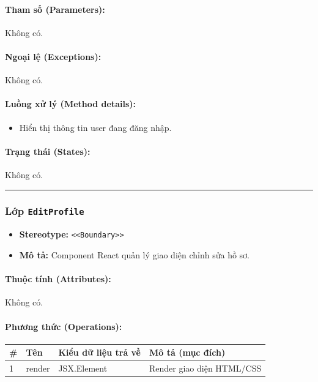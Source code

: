 \documentclass[12pt,a4paper]{article}
\begin{document}
\paragraph{Tham số (Parameters):}
Không có.

\paragraph{Ngoại lệ (Exceptions):}
Không có.

\paragraph{Luồng xử lý (Method details):}
\begin{itemize}[leftmargin=*]
    \item Hiển thị thông tin user đang đăng nhập.
\end{itemize}


\paragraph{Trạng thái (States):}
Không có.

\vskip 0.5cm
\noindent\rule{\textwidth}{0.5pt}
\vskip 0.5cm

\subsubsection{Lớp \texttt{EditProfile}}

\begin{itemize}[leftmargin=*]
    \item \textbf{Stereotype:} \texttt{\textless{}\textless{}Boundary\textgreater{}\textgreater{}}
    \item \textbf{Mô tả:} Component React quản lý giao diện chỉnh sửa hồ sơ.
\end{itemize}

\paragraph{Thuộc tính (Attributes):}
Không có.

\paragraph{Phương thức (Operations):}
\begin{longtable}{|p{0.6cm}|p{5.0cm}|p{2.8cm}|p{5.4cm}|}
\hline
\textbf{\#} & \textbf{Tên} & \textbf{Kiểu dữ liệu trả về} & \textbf{Mô tả (mục đích)} \\ \hline
\endhead
1 & render & JSX.Element & Render giao diện HTML/CSS \\ \hline
\end{longtable}
\end{document}
